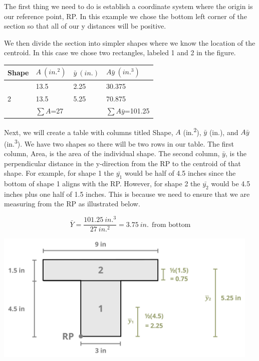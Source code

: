 \documentclass[
  letterpaper,
  DIV=11,
  numbers=noendperiod]{scrreprt}
\theoremstyle{definition}
\theoremstyle{remark}
\begin{document}
\begin{tcolorbox}
\begin{tcolorbox}
The first thing we need to do is establish a coordinate system where the
origin is our reference point, RP. In this example we chose the bottom
left corner of the section so that all of our y distances will be
positive.

We then divide the section into simpler shapes where we know the
location of the centroid. In this case we chose two rectangles, labeled
1 and 2 in the figure.

\begin{longtable}[]{@{}llll@{}}
\toprule\noalign{}
Shape & \(A{~(in.^2)}\) & \(\bar{y}{~(in.)}\) &
\(A\bar{y}{~(in.^3)}\) \\
\midrule\noalign{}
\endhead
\bottomrule\noalign{}
\endlastfoot
1 & 13.5 & 2.25 & 30.375 \\
2 & 13.5 & 5.25 & 70.875 \\
& \(\sum A\)=27 & & \(\sum A\bar{y}\)=101.25 \\
\end{longtable}

Next, we will create a table with columns titled Shape, \(A\)
(in.\textsuperscript{2}), \(\bar{y}\) (in.), and \(A\bar{y}\)
(in.\textsuperscript{3}). We have two shapes so there will be two rows
in our table. The first column, Area, is the area of the individual
shape. The second column, \(\bar{y}\), is the perpendicular distance in
the y-direction from the RP to the centroid of that shape. For example,
for shape 1 the \(\bar{y_1}\) would be half of 4.5 inches since the
bottom of shape 1 aligns with the RP. However, for shape 2 the
\(\bar{y_2}\) would be 4.5 inches plus one half of 1.5 inches. This is
because we need to ensure that we are measuring from the RP as
illustrated below.

\[
\bar{Y}=\frac{101.25{~in.^3}}{27{~in.^2}}=3.75{~in.} ~~\text{from bottom}
\]

\begin{center}
\includegraphics[width=5.01042in,height=\textheight]{images/CH 8 PNGs/example 8.1 part 3.png}
\end{center}


\end{tcolorbox}
\end{tcolorbox}
\end{document}
